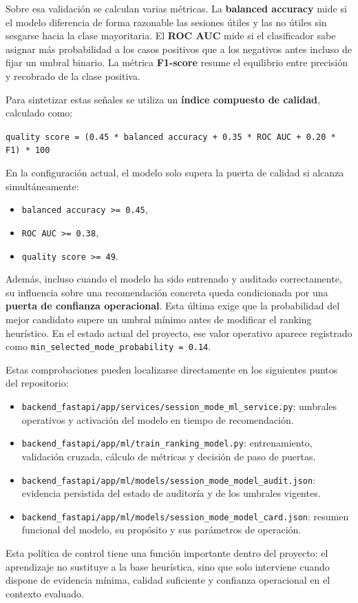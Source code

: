 Sobre esa validación se calculan varias métricas. La
\textbf{balanced accuracy} mide si el modelo diferencia de forma razonable las
sesiones útiles y las no útiles sin sesgarse hacia la clase mayoritaria. El
\textbf{ROC AUC} mide si el clasificador sabe asignar más probabilidad a los
casos positivos que a los negativos antes incluso de fijar un umbral binario.
La métrica \textbf{F1-score} resume el equilibrio entre precisión y recobrado
de la clase positiva.

Para sintetizar estas señales se utiliza un \textbf{índice compuesto de
calidad}, calculado como:

\begin{center}
\texttt{quality score = (0.45 * balanced accuracy + 0.35 * ROC AUC + 0.20 * F1) * 100}
\end{center}

En la configuración actual, el modelo solo supera la puerta de calidad si
alcanza simultáneamente:

\begin{itemize}
    \item \texttt{balanced accuracy >= 0.45},
    \item \texttt{ROC AUC >= 0.38},
    \item \texttt{quality score >= 49}.
\end{itemize}

Además, incluso cuando el modelo ha sido entrenado y auditado correctamente, su
influencia sobre una recomendación concreta queda condicionada por una
\textbf{puerta de confianza operacional}. Esta última exige que la probabilidad
del mejor candidato supere un umbral mínimo antes de modificar el ranking
heurístico. En el estado actual del proyecto, ese valor operativo aparece
registrado como \texttt{min\_selected\_mode\_probability = 0.14}.

Estas comprobaciones pueden localizarse directamente en los siguientes puntos
del repositorio:

\begin{itemize}
    \item \texttt{backend\_fastapi/app/services/session\_mode\_ml\_service.py}: umbrales operativos y activación del modelo en tiempo de recomendación.
    \item \texttt{backend\_fastapi/app/ml/train\_ranking\_model.py}: entrenamiento, validación cruzada, cálculo de métricas y decisión de paso de puertas.
    \item \texttt{backend\_fastapi/app/ml/models/session\_mode\_model\_audit.json}: evidencia persistida del estado de auditoría y de los umbrales vigentes.
    \item \texttt{backend\_fastapi/app/ml/models/session\_mode\_model\_card.json}: resumen funcional del modelo, su propósito y sus parámetros de operación.
\end{itemize}

Esta política de control tiene una función importante dentro del proyecto: el
aprendizaje no sustituye a la base heurística, sino que solo interviene cuando
dispone de evidencia mínima, calidad suficiente y confianza operacional en el
contexto evaluado.
